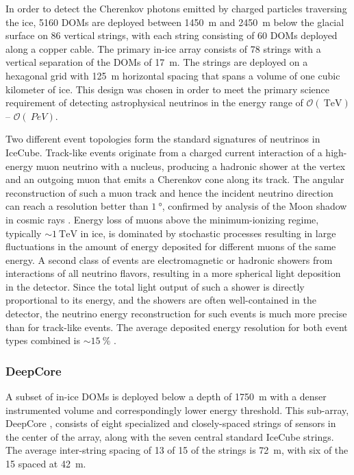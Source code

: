 In order to detect the Cherenkov photons emitted by charged particles
traversing the ice, \num{5160} DOMs are deployed between \SI{1450}{\meter}
and \SI{2450} {\meter} below the glacial surface on \num{86} vertical
strings, with each string consisting of \num{60} DOMs deployed along a copper cable. The
primary in-ice array consists of \num{78} strings with a vertical
separation of the DOMs of \SI{17}{\meter}.  The strings are
deployed on a hexagonal grid with \SI{125}{\meter} horizontal spacing that
spans a volume of one cubic kilometer of ice.  This design was chosen in
order to meet the primary science requirement of detecting astrophysical
neutrinos in the energy range of $\mathcal{O}(\SI{}{\tera\electronvolt})$--
$\mathcal{O}(\SI{}{PeV})$.  %

Two different event topologies form the standard signatures of neutrinos in
IceCube.  Track-like events originate from a charged current interaction of
a high-energy muon neutrino with a nucleus, producing a hadronic shower at
the vertex and an outgoing muon that emits a Cherenkov cone along its
track.  The angular reconstruction of such a muon track and hence the
incident neutrino direction can reach a resolution better than
$\SI{1}{\degree}$, confirmed by analysis of the Moon shadow
in cosmic rays \cite{IC3:moon}. Energy loss of muons above the minimum-ionizing regime, typically $ \sim
\SI{1}{\tera\electronvolt}$ in ice, is dominated by stochastic
processes resulting in large fluctuations in the amount of energy deposited
for different muons of the same energy.  A second class of events are
electromagnetic or hadronic showers from interactions of all neutrino
flavors, resulting in a more spherical light deposition in the detector.
Since the total light output of such a shower is directly proportional to its energy, and
the showers are often well-contained in the detector, the neutrino energy
reconstruction for such events is much more precise than for track-like
events. The average deposited energy resolution for both event types
combined is $ \sim \SI{15}{\%}$ \cite{IC3:ereco}. 

\subsubsection{DeepCore}

A subset of in-ice DOMs is deployed below a
depth of \SI{1750}{\meter} with a denser instrumented volume and
correspondingly lower energy threshold. This
sub-array, DeepCore \cite{ICECUBE:DC}, consists of eight specialized and
closely-spaced strings of sensors in the center of the array, along with
the seven central standard IceCube strings.  The average inter-string
spacing of 13 of 15 of the strings is \SI{72}{\meter}, with six of the 15
spaced at \SI{42}{\meter}.

